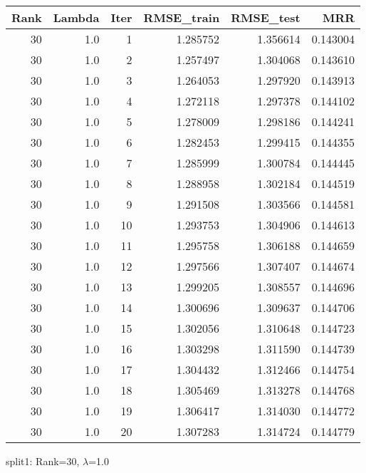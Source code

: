 \begin{tabular}{rrrrrr}
\toprule
 Rank &  Lambda &  Iter &  RMSE\_train &  RMSE\_test &       MRR \\
\midrule
   30 &     1.0 &     1 &    1.285752 &   1.356614 &  0.143004 \\
   30 &     1.0 &     2 &    1.257497 &   1.304068 &  0.143610 \\
   30 &     1.0 &     3 &    1.264053 &   1.297920 &  0.143913 \\
   30 &     1.0 &     4 &    1.272118 &   1.297378 &  0.144102 \\
   30 &     1.0 &     5 &    1.278009 &   1.298186 &  0.144241 \\
   30 &     1.0 &     6 &    1.282453 &   1.299415 &  0.144355 \\
   30 &     1.0 &     7 &    1.285999 &   1.300784 &  0.144445 \\
   30 &     1.0 &     8 &    1.288958 &   1.302184 &  0.144519 \\
   30 &     1.0 &     9 &    1.291508 &   1.303566 &  0.144581 \\
   30 &     1.0 &    10 &    1.293753 &   1.304906 &  0.144613 \\
   30 &     1.0 &    11 &    1.295758 &   1.306188 &  0.144659 \\
   30 &     1.0 &    12 &    1.297566 &   1.307407 &  0.144674 \\
   30 &     1.0 &    13 &    1.299205 &   1.308557 &  0.144696 \\
   30 &     1.0 &    14 &    1.300696 &   1.309637 &  0.144706 \\
   30 &     1.0 &    15 &    1.302056 &   1.310648 &  0.144723 \\
   30 &     1.0 &    16 &    1.303298 &   1.311590 &  0.144739 \\
   30 &     1.0 &    17 &    1.304432 &   1.312466 &  0.144754 \\
   30 &     1.0 &    18 &    1.305469 &   1.313278 &  0.144768 \\
   30 &     1.0 &    19 &    1.306417 &   1.314030 &  0.144772 \\
   30 &     1.0 &    20 &    1.307283 &   1.314724 &  0.144779 \\
\bottomrule
\end{tabular}

\caption{split1: Rank=30, $\lambda$=1.0}
